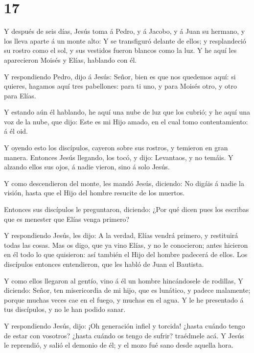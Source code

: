 \hypertarget{section-16}{%
\section{17}\label{section-16}}

 Y después de seis días, Jesús toma á Pedro, y á Jacobo, y á
Juan su hermano, y los lleva aparte á un monte alto:  Y se
transfiguró delante de ellos; y resplandeció su rostro como el sol, y
sus vestidos fueron blancos como la luz.  Y he aquí les
aparecieron Moisés y Elías, hablando con él.

 Y respondiendo Pedro, dijo á Jesús: Señor, bien es que nos
quedemos aquí: si quieres, hagamos aquí tres pabellones: para ti uno, y
para Moisés otro, y otro para Elías.

 Y estando aún él hablando, he aquí una nube de luz que los
cubrió; y he aquí una voz de la nube, que dijo: Este es mi Hijo amado,
en el cual tomo contentamiento: á él oid.

 Y oyendo esto los discípulos, cayeron sobre sus rostros, y
temieron en gran manera.  Entonces Jesús llegando, los tocó,
y dijo: Levantaos, y no temáis.  Y alzando ellos sus ojos, á
nadie vieron, sino á solo Jesús.

 Y como descendieron del monte, les mandó Jesús, diciendo:
No digáis á nadie la visión, hasta que el Hijo del hombre resucite de
los muertos.

 Entonces sus discípulos le preguntaron, diciendo: ¿Por qué
dicen pues los escribas que es menester que Elías venga primero?

 Y respondiendo Jesús, les dijo: A la verdad, Elías vendrá
primero, y restituirá todas las cosas.  Mas os digo, que ya
vino Elías, y no le conocieron; antes hicieron en él todo lo que
quisieron: así también el Hijo del hombre padecerá de ellos.
 Los discípulos entonces entendieron, que les habló de Juan
el Bautista.

 Y como ellos llegaron al gentío, vino á él un hombre
hincándosele de rodillas,  Y diciendo: Señor, ten
misericordia de mi hijo, que es lunático, y padece malamente; porque
muchas veces cae en el fuego, y muchas en el agua.  Y le he
presentado á tus discípulos, y no le han podido sanar.

 Y respondiendo Jesús, dijo: ¡Oh generación infiel y
torcida! ¿hasta cuándo tengo de estar con vosotros? ¿hasta cuándo os
tengo de sufrir? traédmele acá.  Y Jesús le reprendió, y
salió el demonio de él; y el mozo fué sano desde aquella hora.

